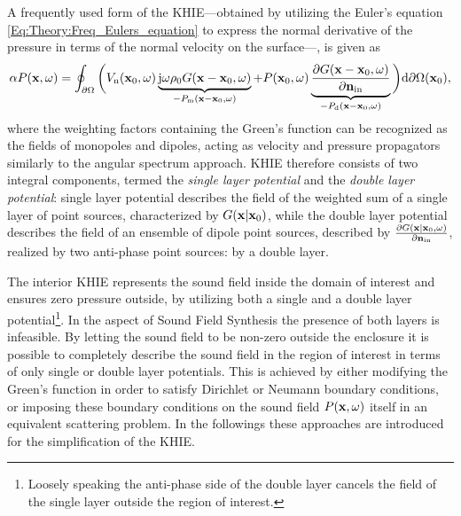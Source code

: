 A frequently used form of the KHIE---obtained by utilizing the Euler's equation \eqref{Eq:Theory:Freq_Eulers_equation} to express the normal derivative of the pressure in terms of the normal velocity on the surface---, is given as	
\begin{equation}
\alpha P(\mathbf{x},\omega) = 
\oint_{\partial \Omega}  \bigg(  
V_{\mathrm{n}}(\mathbf{x}_0,\omega) \underbrace{\mathrm{j} \omega \rho_0 G(\mathbf{x}-\mathbf{x}_0,\omega) }_{-P_{\mathrm{m}}(\mathbf{x}-\mathbf{x}_0,\omega)}
+
P(\mathbf{x}_0,\omega)  \underbrace{\frac{\partial G(\mathbf{x}-\mathbf{x}_0,\omega)}{\partial \mathbf{n}_{\mathrm{in}}}}_{-P_{\mathrm{d}}(\mathbf{x}-\mathbf{x}_0,\omega)}
\bigg)   \mathrm{d} \partial \Omega(\mathbf{x}_0),
\label{Eq:Theory:Kirchhoff}
\end{equation}
where the weighting factors containing the Green's function can be recognized as the fields of monopoles and dipoles, acting as velocity and pressure propagators similarly to the angular spectrum approach.
KHIE therefore consists of two integral components, termed the \emph{single layer potential} and the \emph{double layer potential}: single layer potential describes the field of the weighted sum of a single layer of point sources, characterized by $ G(\mathbf{x}|\mathbf{x}_0) $, while the double layer potential describes the field of an ensemble of dipole point sources, described by $\frac{\partial G(\mathbf{x}|\mathbf{x}_0,\omega)}{\partial \mathbf{n}_{\mathrm{in}}}$, realized by two anti-phase point sources: by a double layer.

The interior KHIE represents the sound field inside the domain of interest and ensures zero pressure outside, by utilizing both a single and a double layer potential\footnote{Loosely speaking the anti-phase side of the double layer cancels the field of the single layer outside the region of interest.}.
In the aspect of Sound Field Synthesis the presence of both layers is infeasible.
By letting the sound field to be non-zero outside the enclosure it is possible to completely describe the sound field in the region of interest in terms of only single or double layer potentials.
This is achieved by either modifying the Green's function in order to satisfy Dirichlet or Neumann boundary conditions, or imposing these boundary conditions on the sound field $P(\mathbf{x},\omega)$ itself in an equivalent scattering problem.
In the followings these approaches are introduced for the simplification of the KHIE.
%
%


